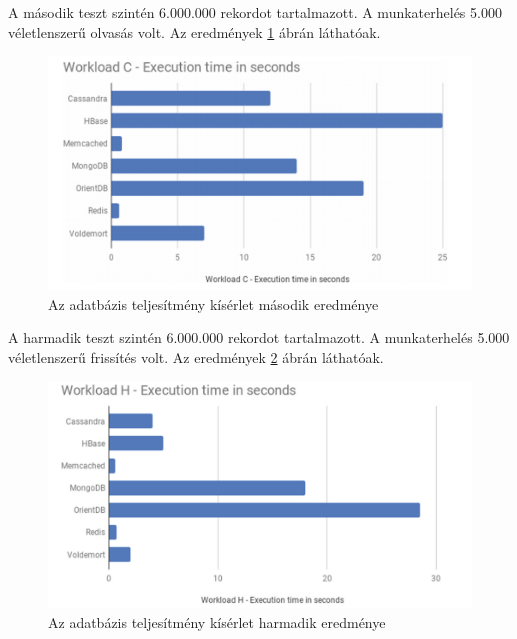A második teszt szintén 6.000.000 rekordot tartalmazott. A munkaterhelés 5.000 véletlenszerű olvasás volt. Az eredmények \ref{fig:performance_b} ábrán láthatóak.
	
	\begin{figure}
		\centering
		\includegraphics[scale=0.6]{figures/images/performance_b.png}
		\caption{Az adatbázis teljesítmény kísérlet második eredménye \cite{martins2019study}}
		\label{fig:performance_b}
	\end{figure}
	
A harmadik teszt szintén 6.000.000 rekordot tartalmazott. A munkaterhelés 5.000 véletlenszerű frissítés volt. Az eredmények \ref{fig:performance_c} ábrán láthatóak.
	
	\begin{figure}
		\centering
		\includegraphics[scale=0.6]{figures/images/performance_c.png}
		\caption{Az adatbázis teljesítmény kísérlet harmadik eredménye \cite{martins2019study}}
		\label{fig:performance_c}
	\end{figure}